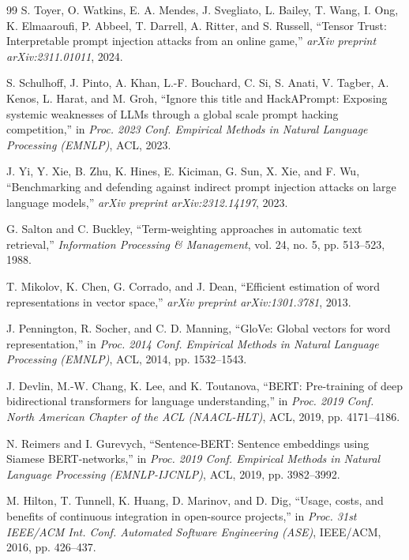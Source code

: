 \begin{thebibliography}{99}
S. Toyer, O. Watkins, E. A. Mendes, J. Svegliato, L. Bailey, T. Wang, I. Ong, K. Elmaaroufi, P. Abbeel, T. Darrell, A. Ritter, and S. Russell, ``Tensor Trust: Interpretable prompt injection attacks from an online game,'' \textit{arXiv preprint arXiv:2311.01011}, 2024.

S. Schulhoff, J. Pinto, A. Khan, L.-F. Bouchard, C. Si, S. Anati, V. Tagber, A. Kenos, L. Harat, and M. Groh, ``Ignore this title and HackAPrompt: Exposing systemic weaknesses of LLMs through a global scale prompt hacking competition,'' in \textit{Proc. 2023 Conf. Empirical Methods in Natural Language Processing (EMNLP)}, ACL, 2023.

J. Yi, Y. Xie, B. Zhu, K. Hines, E. Kiciman, G. Sun, X. Xie, and F. Wu, ``Benchmarking and defending against indirect prompt injection attacks on large language models,'' \textit{arXiv preprint arXiv:2312.14197}, 2023.

G. Salton and C. Buckley, ``Term-weighting approaches in automatic text retrieval,'' \textit{Information Processing \& Management}, vol. 24, no. 5, pp. 513--523, 1988.

T. Mikolov, K. Chen, G. Corrado, and J. Dean, ``Efficient estimation of word representations in vector space,'' \textit{arXiv preprint arXiv:1301.3781}, 2013.

J. Pennington, R. Socher, and C. D. Manning, ``GloVe: Global vectors for word representation,'' in \textit{Proc. 2014 Conf. Empirical Methods in Natural Language Processing (EMNLP)}, ACL, 2014, pp. 1532--1543.

J. Devlin, M.-W. Chang, K. Lee, and K. Toutanova, ``BERT: Pre-training of deep bidirectional transformers for language understanding,'' in \textit{Proc. 2019 Conf. North American Chapter of the ACL (NAACL-HLT)}, ACL, 2019, pp. 4171--4186.

N. Reimers and I. Gurevych, ``Sentence-BERT: Sentence embeddings using Siamese BERT-networks,'' in \textit{Proc. 2019 Conf. Empirical Methods in Natural Language Processing (EMNLP-IJCNLP)}, ACL, 2019, pp. 3982--3992.

M. Hilton, T. Tunnell, K. Huang, D. Marinov, and D. Dig, ``Usage, costs, and benefits of continuous integration in open-source projects,'' in \textit{Proc. 31st IEEE/ACM Int. Conf. Automated Software Engineering (ASE)}, IEEE/ACM, 2016, pp. 426--437.


\end{thebibliography}

